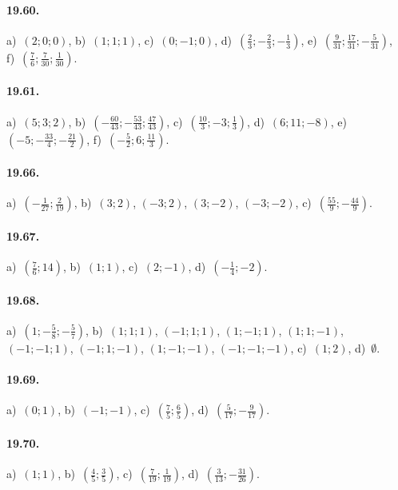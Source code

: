 \paragraph{19.60.} a)~$(2; 0; 0)$, \quad b)~$(1; 1; 1)$, \quad c)~$(0; -1; 0)$, \quad d)~$\left(\frac{2}{3};-\frac{2}{3};-\frac{1}{3}\right)$, \quad e)~$\left(\frac{9}{31};\frac{17}{31};-\frac{5}{31}\right)$, \protect\\ f)~$\left(\frac{7}{6};\frac{7}{30};\frac{1}{30}\right)$.

\paragraph{19.61.} a)~$(5; 3; 2)$, \quad b)~$\left(-{\frac{60}{43}};-\frac{53}{43};\frac{47}{43}\right)$, \quad  c)~$\left(\frac{10}{3};-3;\frac{1}{3}\right)$,
\quad d)~$(6; 11; -8)$, e)~$\left(-5;-\frac{33}{4};-\frac{21}{2}\right)$, f)~$\left(-{\frac{5}{2}};6;\frac{11}{3}\right)$.

\paragraph{19.66.} a)~$\left(-{\frac{1}{27}};\frac{2}{19}\right)$, \quad b)~$(3;2)$, $(-3;2)$, $(3;-2)$, $(-3;-2)$,
\quad c)~$\left(\frac{55}{9};-\frac{44}{9}\right)$.

\paragraph{19.67.} a)~$\left(\frac{7}{6};14\right)$, \quad b)~$\left(1;1\right)$, \quad c)~$\left(2;-1\right)$, \quad d)~$\left(-{\frac{1}{4}};-2\right)$.

\paragraph{19.68.} a)~$\left(1;-\frac{5}{8};-\frac{5}{7}\right)$, \quad b)~$(1;1;1)$, $(-1;1;1)$, $(1;-1;1)$, $(1;1;-1)$, $(-1;-1;1)$, $(-1;1;-1)$, $(1;-1;-1)$, $(-1;-1;-1)$, \quad c)~$(1;2)$, \quad d)~$\emptyset $.


\paragraph{19.69.} a)~$(0;1)$, \quad b)~$(-1;-1)$, \quad c)~$\left(\frac{7}{5};\frac{6}{5}\right)$, \quad d)~$\left(\frac{5}{17};-\frac{9}{17}\right)$.

\paragraph{19.70.} a)~$\left(1;1\right)$, \quad b)~$\left(\frac{4}{5};\frac{3}{5}\right)$, \quad c)~$\left(\frac{7}{19};\frac{1}{19}\right)$,
\quad d)~$\left(\frac{3}{13};-\frac{31}{26}\right)$.

